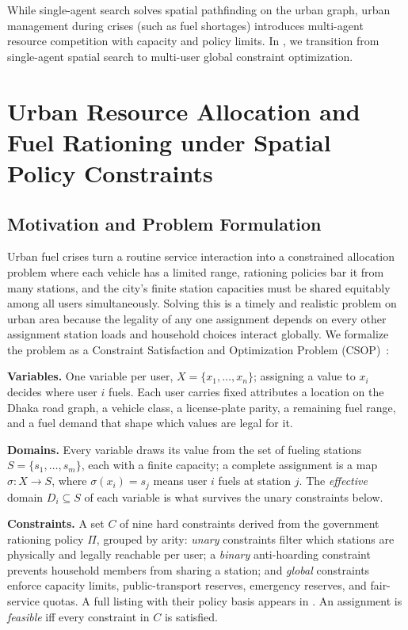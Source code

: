 \documentclass{ai-lab-report}
\begin{document}
While single-agent search solves spatial pathfinding on the urban graph, urban management during crises (such as fuel shortages) introduces multi-agent resource competition with capacity and policy limits. In , we transition from single-agent spatial search to multi-user global constraint optimization.


\section{Urban Resource Allocation and Fuel Rationing under Spatial Policy Constraints}
\label{sec:a2}\label{sec:csp}

\subsection{Motivation and Problem Formulation}
\label{sec:a2formulation}

Urban fuel crises turn a routine service interaction into a constrained allocation problem where each vehicle has a limited range, 
rationing policies bar it from many stations, and the city's finite station capacities must be shared equitably among all users simultaneously. 
Solving this is a timely and realistic problem on urban area because the legality of any one assignment depends on every other assignment 
station loads and household choices interact globally. 
We formalize the problem as a Constraint Satisfaction and Optimization Problem (CSOP)~\citep{dechter2003constraint,russell2021ai}:

\textbf{Variables.} One variable per user, $X=\{x_1,\dots,x_n\}$; assigning a value to $x_i$ decides where user $i$ fuels. Each user carries fixed attributes a location on the Dhaka road graph, a vehicle class, a license-plate parity, a remaining fuel range, and a fuel demand that shape which values are legal for it.

\textbf{Domains.} Every variable draws its value from the set of fueling stations $S=\{s_1,\dots,s_m\}$, each with a finite capacity; a complete assignment is a map $\sigma:X\to S$, where $\sigma(x_i)=s_j$ means user $i$ fuels at station $j$. The \emph{effective} domain $D_i\subseteq S$ of each variable is what survives the unary constraints below.

\textbf{Constraints.} A set $C$ of nine hard constraints derived from the government rationing policy $\Pi$, grouped by arity: \emph{unary} constraints filter which stations are physically and legally reachable per user; a \emph{binary} anti-hoarding constraint prevents household members from sharing a station; and \emph{global} constraints enforce capacity limits, public-transport reserves, emergency reserves, and fair-service quotas. A full listing with their policy basis appears in . An assignment is \emph{feasible} iff every constraint in $C$ is satisfied.
\end{document}
